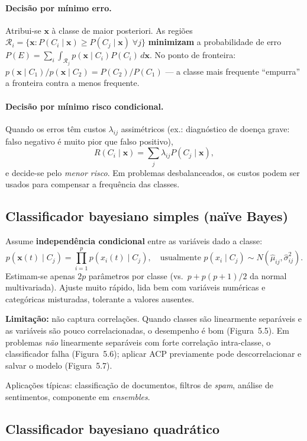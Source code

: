 \paragraph{Decisão por mínimo erro.}
Atribui-se $\mathbf{x}$ à classe de maior posteriori. As regiões
$\mathcal{R}_i=\{\mathbf{x}:P(C_i\mid\mathbf{x})\geq P(C_j\mid\mathbf{x})\;\forall j\}$
\textbf{minimizam} a probabilidade de erro
$P(E)=\sum_i\int_{\mathcal{R}_j}p(\mathbf{x}\mid C_i)P(C_i)\,d\mathbf{x}$.
No ponto de fronteira:
$p(\mathbf{x}\mid C_1)/p(\mathbf{x}\mid C_2)=P(C_2)/P(C_1)$ --- a
classe mais frequente ``empurra'' a fronteira contra a menos frequente.

\paragraph{Decisão por mínimo risco condicional.}
Quando os erros têm custos $\lambda_{ij}$ assimétricos (ex.: diagnóstico
de doença grave: falso negativo é muito pior que falso positivo),
\[
R(C_i\mid\mathbf{x})=\sum_{j}\lambda_{ij}P(C_j\mid\mathbf{x}),
\]
e decide-se pelo \emph{menor risco}. Em problemas desbalanceados, os
custos podem ser usados para compensar a frequência das classes.

\subsection{Classificador bayesiano simples (naïve Bayes)}

Assume \textbf{independência condicional} entre as variáveis dado a
classe:
\[
p(\mathbf{x}(t)\mid C_j)=\prod_{i=1}^{p}p(x_i(t)\mid C_j),
\quad\text{usualmente }p(x_i\mid C_j)\sim N(\hat\mu_{ij},\hat\sigma_{ij}^2).
\]
Estimam-se apenas $2p$ parâmetros por classe (vs.\
$p+p(p+1)/2$ da normal multivariada). Ajuste muito rápido, lida bem
com variáveis numéricas e categóricas misturadas, tolerante a valores
ausentes.

\textbf{Limitação:} não captura correlações. Quando classes são
linearmente separáveis e as variáveis são pouco correlacionadas, o
desempenho é bom (Figura~5.5). Em problemas \emph{não} linearmente
separáveis com forte correlação intra-classe, o classificador falha
(Figura~5.6); aplicar ACP previamente pode descorrelacionar e salvar o
modelo (Figura~5.7).

Aplicações típicas: classificação de documentos, filtros de
\emph{spam}, análise de sentimentos, componente em \emph{ensembles}.

\subsection{Classificador bayesiano quadrático}

